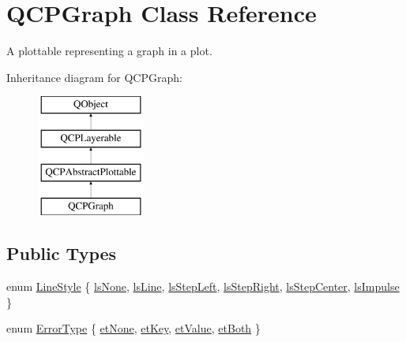 \hypertarget{class_q_c_p_graph}{}\section{Q\+C\+P\+Graph Class Reference}
\label{class_q_c_p_graph}


A plottable representing a graph in a plot.  


Inheritance diagram for Q\+C\+P\+Graph\+:\begin{figure}[H]
\begin{center}
\leavevmode
\includegraphics[height=4.000000cm]{class_q_c_p_graph}
\end{center}
\end{figure}
\subsection*{Public Types}
\begin{DoxyCompactItemize}
\item 
enum \hyperlink{class_q_c_p_graph_ad60175cd9b5cac937c5ee685c32c0859}{Line\+Style} \{ \newline
\hyperlink{class_q_c_p_graph_ad60175cd9b5cac937c5ee685c32c0859aea9591b933733cc7b20786b71e60fa04}{ls\+None}, 
\hyperlink{class_q_c_p_graph_ad60175cd9b5cac937c5ee685c32c0859a3c42a27b15aa3c92d399082fad8b7515}{ls\+Line}, 
\hyperlink{class_q_c_p_graph_ad60175cd9b5cac937c5ee685c32c0859ae10568bda57836487d9dec5eba1d6c6e}{ls\+Step\+Left}, 
\hyperlink{class_q_c_p_graph_ad60175cd9b5cac937c5ee685c32c0859a9c37951f7d11aa070100fd16f2935c9e}{ls\+Step\+Right}, 
\newline
\hyperlink{class_q_c_p_graph_ad60175cd9b5cac937c5ee685c32c0859a5adf7b04da215a40a764c21294ea7366}{ls\+Step\+Center}, 
\hyperlink{class_q_c_p_graph_ad60175cd9b5cac937c5ee685c32c0859aa3b358b4ae7cca94aceeb8e529c12ebb}{ls\+Impulse}
 \}
\item 
enum \hyperlink{class_q_c_p_graph_ad23b514404bd2cb3216f57c90904d6af}{Error\+Type} \{ \hyperlink{class_q_c_p_graph_ad23b514404bd2cb3216f57c90904d6afaeae745e7cc1766bb8546e35d4b76a711}{et\+None}, 
\hyperlink{class_q_c_p_graph_ad23b514404bd2cb3216f57c90904d6afa2a5d89cd76fb8b6b18d71b8f6f6c0f43}{et\+Key}, 
\hyperlink{class_q_c_p_graph_ad23b514404bd2cb3216f57c90904d6afa147022ccdc49f6bd48f904cb4f61872e}{et\+Value}, 
\hyperlink{class_q_c_p_graph_ad23b514404bd2cb3216f57c90904d6afa761cb7d61670c1e2efecccd8974409ab}{et\+Both}
 \}
\end{DoxyCompactItemize}
